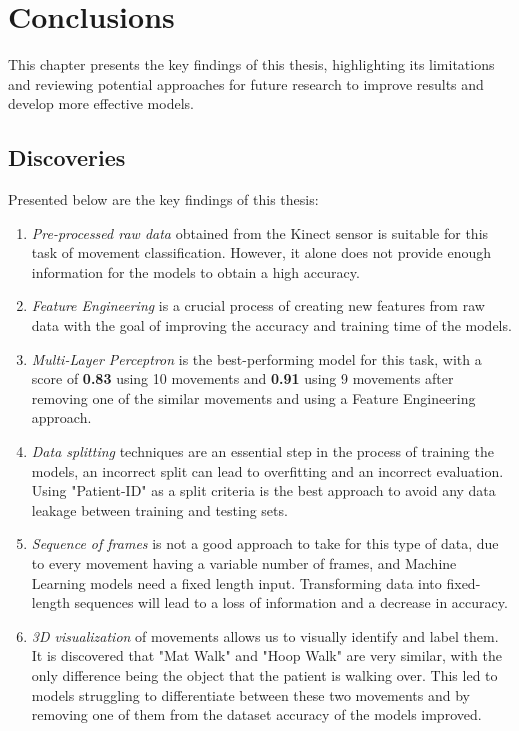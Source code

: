 \hypersetup{colorlinks=true, linkcolor=blue, citecolor=red}

\chapter{Conclusions} \label{chap:conclusions}

    This chapter presents the key findings of this thesis, highlighting its limitations and reviewing potential approaches for future research to improve results and develop more effective models.

    \section{Discoveries}

        Presented below are the key findings of this thesis: 
        \begin{enumerate}
            \item \textit{Pre-processed raw data} obtained from the Kinect sensor is suitable for this task of movement classification. However, it alone does not provide enough information for the models to obtain a high accuracy.
            \item \textit{Feature Engineering} is a crucial process of creating new features from raw data with the goal of improving the accuracy and training time of the models.
            \item \textit{Multi-Layer Perceptron} is the best-performing model for this task, with a score of \textbf{0.83} using 10 movements and \textbf{0.91} using 9 movements after removing one of the similar movements and using a Feature Engineering approach.
            \item \textit{Data splitting} techniques are an essential step in the process of training the models, an incorrect split can lead to overfitting and an incorrect evaluation. Using "Patient-ID" as a split criteria is the best approach to avoid any data leakage between training and testing sets.
            \item \textit{Sequence of frames} is not a good approach to take for this type of data, due to every movement having a variable number of frames, and Machine Learning models need a fixed length input. Transforming data into fixed-length sequences will lead to a loss of information and a decrease in accuracy.
            \item \textit{3D visualization} of movements allows us to visually identify and label them. It is discovered that "Mat Walk" and "Hoop Walk" are very similar, with the only difference being the object that the patient is walking over. This led to models struggling to differentiate between these two movements and by removing one of them from the dataset accuracy of the models improved.
        \end{enumerate}
    

